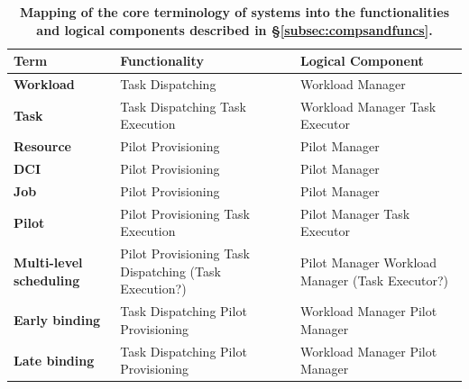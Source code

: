 \documentclass{sig-alternate}
\begin{document}
\begin{table}
 \centering
 \begin{tabular}{|p{4cm}|p{3.2cm}|p{3.2cm}|}
  \hline
    \textbf{Term} & \textbf{Functionality} & \textbf{Logical Component} \\
  \hline
  \hline
    \textbf{Workload} & Task Dispatching & Workload Manager \\
  \hline
    \textbf{Task} & Task Dispatching \newline
    Task Execution & Workload Manager \newline
    Task Executor \\
  \hline
    \textbf{Resource} & Pilot Provisioning & Pilot Manager \\
  \hline
    \textbf{DCI} & Pilot Provisioning & Pilot Manager \\
  \hline
    \textbf{Job} & Pilot Provisioning & Pilot Manager \\
  \hline
    \textbf{Pilot} & Pilot Provisioning \newline
    Task Execution & Pilot Manager \newline
    Task Executor \\
  \hline
    \textbf{Multi-level scheduling} &
    Pilot Provisioning \newline Task Dispatching \newline (Task Execution?) &
    Pilot Manager \newline Workload Manager \newline (Task Executor?) \\
  \hline
    \textbf{Early binding} & Task Dispatching \newline
    Pilot Provisioning & Workload Manager \newline
    Pilot Manager\\
  \hline
    \textbf{Late binding} & Task Dispatching \newline
    Pilot Provisioning  & Workload Manager \newline
    Pilot Manager\\
  \hline
 \end{tabular}
 \caption{\textbf{Mapping of the core terminology of \pilot systems into
  the functionalities and logical components described in
  \S\ref{subsec:compsandfuncs}.}}
 \label{table:terminology}
\end{table}
\end{document}
